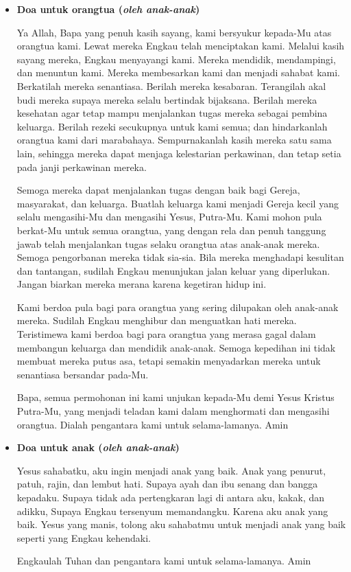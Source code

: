 \documentclass[a5paper,12pt,openany]{scrbook}
\newcommand{\BP}[1]{\begin{itemize} \item[P:] #1 \end{itemize}}
\begin{document}
\BP{\textbf{Doa untuk orangtua (\textit{oleh anak-anak})}

\small
Ya Allah, Bapa yang penuh kasih sayang, kami bersyukur kepada-Mu atas orangtua kami. Lewat mereka Engkau telah menciptakan kami. Melalui kasih sayang mereka, Engkau menyayangi kami. Mereka mendidik, mendampingi, dan menuntun kami. Mereka membesarkan kami dan menjadi sahabat kami.
Berkatilah mereka senantiasa. Berilah mereka kesabaran. Terangilah akal budi mereka supaya mereka selalu bertindak bijaksana. Berilah mereka kesehatan agar tetap mampu menjalankan tugas mereka sebagai pembina keluarga. Berilah rezeki secukupnya untuk kami semua; dan hindarkanlah orangtua kami dari marabahaya. Sempurnakanlah kasih mereka satu sama lain, sehingga mereka dapat menjaga kelestarian perkawinan, dan tetap setia pada janji perkawinan mereka.

Semoga mereka dapat menjalankan tugas dengan baik bagi Gereja, masyarakat, dan keluarga. Buatlah keluarga kami menjadi Gereja kecil yang selalu mengasihi-Mu dan mengasihi Yesus, Putra-Mu.
Kami mohon pula berkat-Mu untuk semua orangtua, yang dengan rela dan penuh tanggung jawab telah menjalankan tugas selaku orangtua atas anak-anak mereka. Semoga pengorbanan mereka tidak sia-sia. Bila mereka menghadapi kesulitan dan tantangan, sudilah Engkau menunjukan jalan keluar yang diperlukan. Jangan biarkan mereka merana karena kegetiran hidup ini.

Kami berdoa pula bagi para orangtua yang sering dilupakan oleh anak-anak mereka. Sudilah Engkau menghibur dan menguatkan hati mereka. Teristimewa kami berdoa bagi para orangtua yang merasa gagal dalam membangun keluarga dan mendidik anak-anak. Semoga kepedihan ini tidak membuat mereka putus asa, tetapi semakin menyadarkan mereka untuk senantiasa bersandar pada-Mu.

Bapa, semua permohonan ini kami unjukan kepada-Mu demi Yesus Kristus Putra-Mu, yang menjadi teladan kami dalam menghormati dan mengasihi orangtua. Dialah pengantara kami untuk selama-lamanya. Amin
}
\normalsize

\BP{\textbf{Doa untuk anak (\textit{oleh anak-anak})}

\small
Yesus sahabatku, aku ingin menjadi anak yang baik. Anak yang penurut, patuh, rajin, dan lembut hati. Supaya ayah dan ibu senang dan bangga kepadaku. Supaya tidak ada pertengkaran lagi di antara aku, kakak, dan adikku, Supaya Engkau tersenyum memandangku. Karena aku anak yang baik. Yesus yang manis, tolong aku sahabatmu untuk menjadi anak yang baik seperti yang Engkau kehendaki.  

Engkaulah Tuhan dan pengantara kami untuk selama-lamanya. Amin
}
\end{document}
